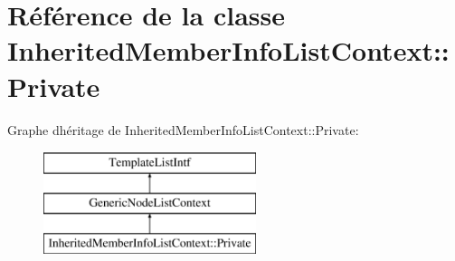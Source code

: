 \hypertarget{class_inherited_member_info_list_context_1_1_private}{}\section{Référence de la classe Inherited\+Member\+Info\+List\+Context\+:\+:Private}
\label{class_inherited_member_info_list_context_1_1_private}
Graphe d\textquotesingle{}héritage de Inherited\+Member\+Info\+List\+Context\+:\+:Private\+:\begin{figure}[H]
\begin{center}
\leavevmode
\includegraphics[height=3.000000cm]{class_inherited_member_info_list_context_1_1_private}
\end{center}
\end{figure}
